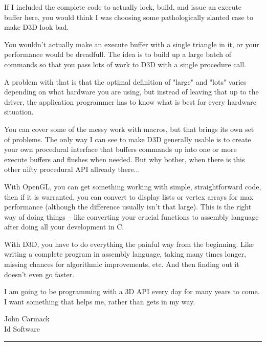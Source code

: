 \begin{allintypewriter}
\par
If I included the complete code to actually lock, build, and issue an execute buffer here, you would think I 
was choosing some pathologically slanted case to make D3D look bad.\\ 
\par
You wouldn't actually make an execute buffer with a single triangle in it, or your performance would be 
dreadfull. The idea is to build up a large batch of commands so that you pass lots of work to D3D with a single 
procedure call.\\ 
\par
A problem with that is that the optimal definition of "large" and "lots" varies depending on what hardware you 
are using, but instead of leaving that up to the driver, the application programmer has to know what is best 
for every hardware situation.\\ 
\par
You can cover some of the messy work with macros, but that brings its own set of problems. The only way I can 
see to make D3D generally usable is to create your own procedural interface that buffers commands up into one 
or more execute buffers and flushes when needed. But why bother, when there is this other nifty procedural API 
allready there...\\ 
\par
With OpenGL, you can get something working with simple, straightforward code, then if it is warranted, you can 
convert to display lists or vertex arrays for max performance (although the difference usually isn't that large). 
This is the right way of doing things -- like converting your crucial functions to assembly language after doing 
all your development in C.\\ 
\par
With D3D, you have to do everything the painful way from the beginning. Like writing a complete program in 
assembly language, taking many times longer, missing chances for algorithmic improvements, etc. And then finding 
out it doesn't even go faster.\\ 
\par
I am going to be programming with a 3D API every day for many years to come. I want something that helps me, 
rather than gets in my way.\\ 
\par
John Carmack\\ 
Id Software\\ 
\par
\end{allintypewriter}
\par \hrule
